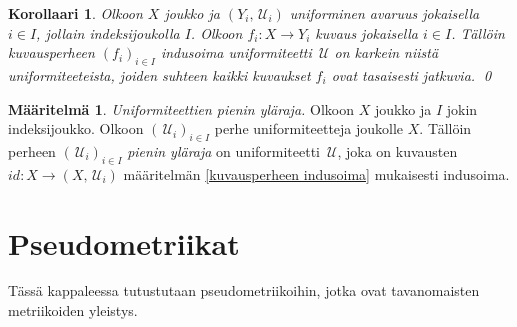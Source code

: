 \documentclass[12pt,a4paper,leqno]{report}
\newcommand{\U}{\,\mathcal{U}}
\theoremstyle{plain}
\newtheorem{kor}[equation]{Korollaari}
\theoremstyle{definition}
\newtheorem{maar}[equation]{Määritelmä}
\theoremstyle{remark}
\begin{document}
\begin{kor}
Olkoon $X$ joukko ja $(Y_i,\U_i)$ uniforminen avaruus jokaisella $i\in I$, jollain indeksijoukolla $I$. 
Olkoon $f_i\colon X\rightarrow Y_i$ kuvaus jokaisella $i\in I$.
Tällöin kuvausperheen $(f_i)_{i\in I}$ indusoima uniformiteetti $\U$ on karkein niistä uniformiteeteista, 
joiden suhteen kaikki kuvaukset $f_i$ ovat tasaisesti jatkuvia.
\qed
%
\end{kor}
\begin{maar}
\emph{Uniformiteettien pienin yläraja.}
Olkoon $X$ joukko ja $I$ jokin indeksijoukko.
Olkoon $(\U_i)_{i\in I}$ perhe uniformiteetteja joukolle $X$.
Tällöin perheen $(\U_i)_{i\in I}$ \emph{pienin yläraja} on uniformiteetti $\U$, joka on kuvausten $id\colon X\rightarrow (X,\U_i)$ määritelmän \ref{kuvausperheen indusoima} mukaisesti indusoima.
\end{maar}
\chapter{Pseudometriikat}
Tässä kappaleessa tutustutaan pseudometriikoihin, jotka ovat tavanomaisten metriikoiden yleistys. 
\end{document}
